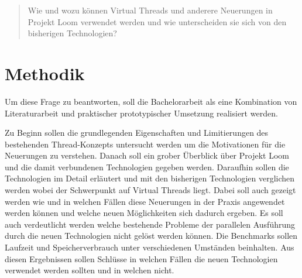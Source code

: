 \begin{quote}
	Wie und wozu können Virtual Threads und anderere Neuerungen in Projekt Loom verwendet werden und wie unterscheiden sie sich von den bisherigen Technologien?
\end{quote}


\section{Methodik}





Um diese Frage zu beantworten, soll die Bachelorarbeit als eine
Kombination von Literaturarbeit und praktischer \bzw prototypischer Umsetzung
realisiert werden.

Zu Beginn sollen die grundlegenden Eigenschaften und Limitierungen des bestehenden 
Thread-Konzepts untersucht werden um die Motivationen für die Neuerungen zu verstehen. 
Danach soll ein grober Überblick über Projekt Loom und die damit verbundenen Technologien gegeben werden.
Daraufhin sollen die Technologien im Detail erläutert und mit den bisherigen Technologien 
verglichen werden wobei der Schwerpunkt auf Virtual Threads liegt.
Dabei soll auch gezeigt werden wie und in welchen Fällen diese Neuerungen in der Praxis 
angewendet werden können und welche neuen Möglichkeiten sich dadurch ergeben.
Es soll auch verdeutlicht werden welche bestehende Probleme der parallelen Ausführung 
durch die neuen Technologien nicht gelöst werden können.
Die Benchmarks sollen Laufzeit und Speicherverbrauch unter verschiedenen Umständen beinhalten.
Aus diesen Ergebnissen sollen Schlüsse in welchen Fällen die neuen Technologien 
verwendet werden sollten und in welchen nicht.






